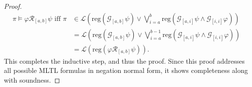 \documentclass[runningheads]{llncs}
\renewcommand{\phi}{\varphi}
\begin{document}
\begin{proof}
  \begin{align*}
    \pi \vDash \varphi \mathcal{R}_{[a,b]} \psi \text{ iff } \pi &\in \mathscr{L}\left(\text{reg}(\mathcal{G}_{[a,b]} \psi) \lor \bigvee_{i=a}^{b} \text{reg}\left(\mathcal{G}_{[a,i]}\psi \land \mathcal{G}_{[i, i]} \phi\right)\right) \\
    &= \mathscr{L}\left(\text{reg}(\mathcal{G}_{[a,b]} \psi) \lor \bigvee_{i=a}^{b-1} \text{reg}\left(\mathcal{G}_{[a,i]}\psi \land \mathcal{G}_{[i, i]} \phi\right)\right)\\
    &= \mathscr{L}\left(\text{reg}(\varphi \mathcal{R}_{[a,b]} \psi)\right).
  \end{align*}
 \noindent This completes the inductive step, and thus the proof. Since this proof addresses all possible MLTL formulas in negation normal form, it shows completeness along with soundness.
 \end{proof}


\end{document}
